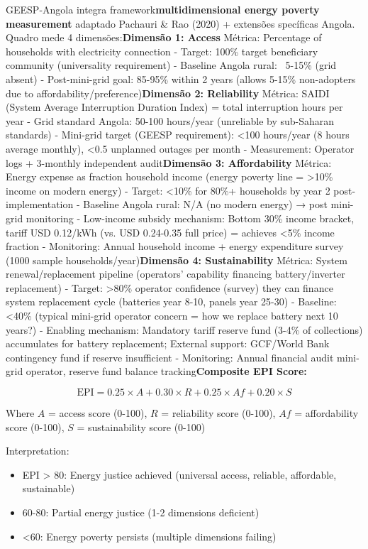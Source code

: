 \documentclass[12pt, a4paper]{article}
\begin{document}
GEESP-Angola integra framework\textbf{multidimensional energy poverty measurement} adaptado Pachauri \& Rao (2020) + extensões specíficas Angola. Quadro mede 4 dimensões:\textbf{Dimensão 1: Access}
Métrica: Percentage of households with electricity connection
- Target: 100\% target beneficiary community (universality requirement)
- Baseline Angola rural: ~5-15\% (grid absent)
- Post-mini-grid goal: 85-95\% within 2 years (allows 5-15\% non-adopters due to affordability/preference)\textbf{Dimensão 2: Reliability}
Métrica: SAIDI (System Average Interruption Duration Index) = total interruption hours per year
- Grid standard Angola: 50-100 hours/year (unreliable by sub-Saharan standards)
- Mini-grid target (GEESP requirement): <100 hours/year (8 hours average monthly), <0.5 unplanned outages per month
- Measurement: Operator logs + 3-monthly independent audit\textbf{Dimensão 3: Affordability}
Métrica: Energy expense as fraction household income (energy poverty line = >10\% income on modern energy)
- Target: <10\% for 80\%+ households by year 2 post-implementation
- Baseline Angola rural: N/A (no modern energy) → post mini-grid monitoring
- Low-income subsidy mechanism: Bottom 30\% income bracket, tariff USD 0.12/kWh (vs. USD 0.24-0.35 full price) = achieves <5\% income fraction
- Monitoring: Annual household income + energy expenditure survey (1000 sample households/year)\textbf{Dimensão 4: Sustainability}
Métrica: System renewal/replacement pipeline (operators' capability financing battery/inverter replacement)
- Target: >80\% operator confidence (survey) they can finance system replacement cycle (batteries year 8-10, panels year 25-30)
- Baseline: <40\% (typical mini-grid operator concern = how we replace battery next 10 years?)
- Enabling mechanism: Mandatory tariff reserve fund (3-4\% of collections) accumulates for battery replacement; External support: GCF/World Bank contingency fund if reserve insufficient
- Monitoring: Annual financial audit mini-grid operator, reserve fund balance tracking\textbf{Composite EPI Score:}

$$\text{EPI} = 0.25 \times A + 0.30 \times R + 0.25 \times Af + 0.20 \times S$$

Where $A$ = access score (0-100), $R$ = reliability score (0-100), $Af$ = affordability score (0-100), $S$ = sustainability score (0-100)

Interpretation:
\begin{itemize}
\item EPI > 80: Energy justice achieved (universal access, reliable, affordable, sustainable)
\item 60-80: Partial energy justice (1-2 dimensions deficient)
\item <60: Energy poverty persists (multiple dimensions failing)
\end{itemize}
\end{document}

